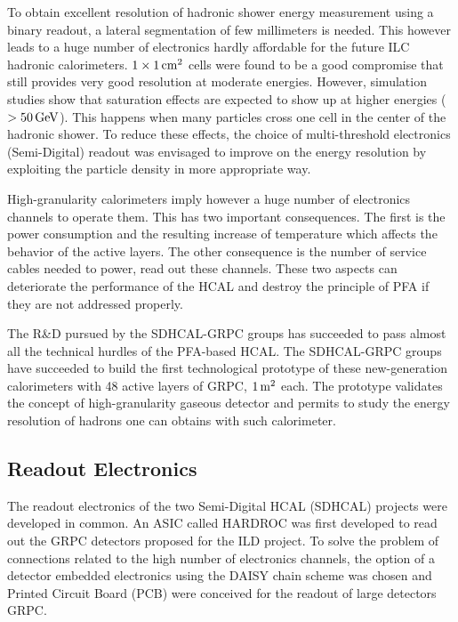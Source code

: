 To obtain excellent resolution of hadronic shower energy measurement using a
binary readout, a lateral segmentation of few millimeters is needed. This
however leads to a huge number of electronics hardly affordable for the future
ILC hadronic calorimeters. $\unit[1\times 1]{cm^2}$ cells were found to be a good compromise
that still provides very good resolution at moderate energies. However,
simulation studies show that saturation effects are expected to show up at
higher energies ($> \unit[50]{GeV}$). This happens when many particles cross
one cell in the center of the hadronic shower. To reduce these effects, the
choice of multi-threshold electronics (Semi-Digital) readout was envisaged to
improve on the energy resolution by exploiting the particle density in more
appropriate way.

High-granularity calorimeters imply however a huge number of electronics
channels to operate them. This has two important consequences. The first is the
power consumption and the resulting increase of temperature which affects the
behavior of the active layers. The other consequence is the number of service
cables needed to power, read out these channels. These two aspects can
deteriorate the performance of the HCAL and destroy the principle of PFA if
they are not addressed properly.

The R\&D pursued by the SDHCAL-GRPC groups has succeeded to pass almost all the
technical hurdles of the PFA-based HCAL. The SDHCAL-GRPC groups have succeeded
to build the first technological prototype of these new-generation calorimeters
with 48 active layers of GRPC, $\unit[1]{m^2}$ each. The prototype validates the concept
of high-granularity gaseous detector and permits to study the energy resolution
of hadrons one can obtains with such calorimeter.


\subsection{Readout Electronics}

The readout electronics of the two Semi-Digital HCAL (SDHCAL) projects were
developed in common. An ASIC called HARDROC was first developed to read out the
GRPC detectors proposed for the ILD project. To solve the problem of
connections related to the high number of electronics channels, the option of a
detector embedded electronics using the DAISY chain scheme was chosen and
Printed Circuit Board (PCB) were conceived for the readout of large detectors
GRPC.

